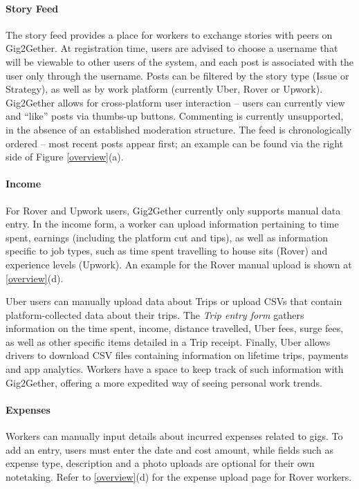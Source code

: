 \paragraph{Story Feed} The story feed provides a place for workers to exchange stories with peers on Gig2Gether. 
At registration time, users are advised to choose a username that will be viewable to other users of the system, and each post is associated with the user only through the username. Posts can be filtered by the story type (Issue or Strategy), as well as by work platform (currently Uber, Rover or Upwork). Gig2Gether allows for cross-{platform} user interaction -- users can currently view and ``like'' posts via thumbs-up buttons. Commenting is currently unsupported, in the absence of an established moderation structure.
The feed is chronologically ordered -- most recent posts appear first; an example can be found via the right side of Figure \ref{overview}(a).

\paragraph{Income} 
For Rover and Upwork users, Gig2Gether currently only supports manual data entry. 
In the income form, a worker can upload information pertaining to time spent, earnings (including the platform cut and tips), as well as information specific to job types, such as time spent travelling to house sits (Rover) and experience levels (Upwork). 
An example for the Rover manual upload is shown at \ref{overview}(d).

Uber users can manually upload data about Trips or upload CSVs that contain platform-collected data about their trips.
The \textit{Trip entry form} gathers information on the time spent, income, distance travelled, Uber fees, surge fees, as well as other specific items detailed in a Trip receipt. 
Finally, Uber allows drivers to download CSV files containing information on lifetime trips, payments and app analytics. Workers have a space to keep track of such information with Gig2Gether, offering a more expedited way of seeing personal work trends.

\paragraph{Expenses} Workers can manually input details about
incurred expenses related to gigs. To add an entry, users must enter the date and cost amount, while fields such as expense type, description and a photo uploads are optional for their own notetaking. Refer to \ref{overview}(d) for the expense upload page for Rover workers.

